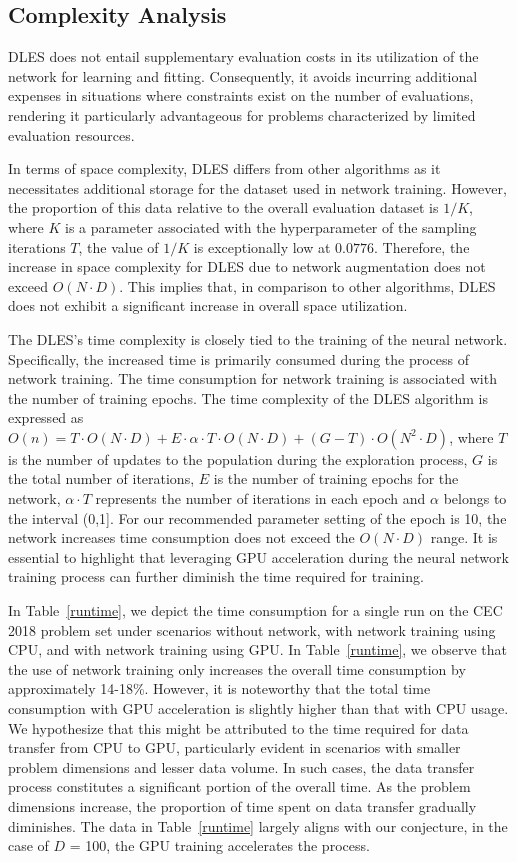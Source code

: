 \documentclass[journal,twoside]{IEEEtran}
\begin{document}
\subsection{Complexity Analysis}
DLES does not entail supplementary evaluation costs in its utilization of the network for learning and fitting. Consequently, it avoids incurring additional expenses in situations where constraints exist on the number of evaluations, rendering it particularly advantageous for problems characterized by limited evaluation resources.

In terms of space complexity, DLES differs from other algorithms as it necessitates additional storage for the dataset used in network training. However, the proportion of this data relative to the overall evaluation dataset is $1/K$, where $K$ is a parameter associated with the hyperparameter of the sampling iterations  $T$, the value of $1/K$ is exceptionally low at $0.0776$. Therefore, the increase in space complexity for DLES due to network augmentation does not exceed $O(N \cdot D)$. This implies that, in comparison to other algorithms, DLES does not exhibit a significant increase in overall space utilization.

The DLES's time complexity is closely tied to the training of the neural network. Specifically, the increased time is primarily consumed during the process of network training. The time consumption for network training is associated with the number of training epochs. The time complexity of the DLES algorithm is expressed as $O(n) = T \cdot O(N \cdot D) +  E \cdot \alpha \cdot T \cdot O(N \cdot D) + (G-T)\cdot O(N^{2} \cdot D)$, where $T$ is the number of updates to the population during the exploration process, $G$ is the total number of iterations, $E$ is the number of training epochs for the network, $\alpha \cdot T$ represents the number of iterations in each epoch and $\alpha$ belongs to the interval (0,1]. For our recommended parameter setting of the epoch is 10, the network increases time consumption does not exceed the $O(N \cdot D)$ range. It is essential to highlight that leveraging GPU acceleration during the neural network training process can further diminish the time required for training.

In Table~\ref{runtime}, we depict the time consumption for a single run on the CEC 2018 problem set under scenarios without network, with network training using CPU, and with network training using GPU. In Table~\ref{runtime}, we observe that the use of network training only increases the overall time consumption by approximately 14-18\%. However, it is noteworthy that the total time consumption with GPU acceleration is slightly higher than that with CPU usage. We hypothesize that this might be attributed to the time required for data transfer from CPU to GPU, particularly evident in scenarios with smaller problem dimensions and lesser data volume. In such cases, the data transfer process constitutes a significant portion of the overall time. As the problem dimensions increase, the proportion of time spent on data transfer gradually diminishes. The data in Table~\ref{runtime} largely aligns with our conjecture, in the case of $D$ = 100, the GPU training accelerates the process.
\end{document}
